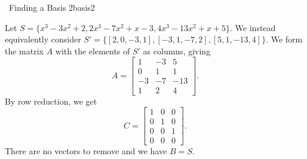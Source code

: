         \begin{example}{\Difficulty\,\Difficulty\,\,Finding a Basis 2}{basis2}

            Let \(S=\{x^3-3x^2+2,2x^3-7x^2+x-3,4x^3-13x^2+x+5\}\). We instead equivalently consider \(S'=\{[2,0,-3,1],[-3,1,-7,2],[5,1,-13,4]\}\). We form the matrix \(A\) with the elements of \(S'\) as columns, giving
            \begin{equation*}
                A=\begin{bmatrix}
                    1 & -3 & 5 \\
                    0 & 1 & 1 \\
                    -3 & -7 & -13 \\
                    1 & 2 & 4
                \end{bmatrix}.
            \end{equation*}
            By row reduction, we get
            \begin{equation*}
                C=\begin{bmatrix}
                    1 & 0 & 0 \\
                    0 & 1 & 0 \\
                    0 & 0 & 1 \\
                    0 & 0 & 0 
                \end{bmatrix}.
            \end{equation*} 
            There are no vectors to remove and we have \(B=S\).
        \end{example}
        \pagebreak
